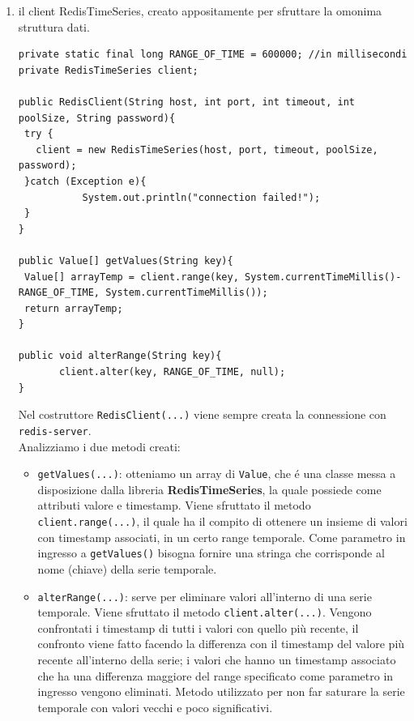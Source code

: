 \begin{enumerate}
    \item il client RedisTimeSeries, creato appositamente per sfruttare la omonima struttura dati.
    \begin{lstlisting}[autogobble, title={\texttt{RedisClient.java}}]
private static final long RANGE_OF_TIME = 600000; //in millisecondi
private RedisTimeSeries client;

public RedisClient(String host, int port, int timeout, int poolSize, String password){
 try {
   client = new RedisTimeSeries(host, port, timeout, poolSize, password);
 }catch (Exception e){
           System.out.println("connection failed!");
 }
}

public Value[] getValues(String key){
 Value[] arrayTemp = client.range(key, System.currentTimeMillis()-RANGE_OF_TIME, System.currentTimeMillis());
 return arrayTemp;
}

public void alterRange(String key){
       client.alter(key, RANGE_OF_TIME, null);
}
\end{lstlisting}
    Nel costruttore \texttt{RedisClient(...)} viene sempre creata la connessione con \texttt{redis-server}.\\
    Analizziamo i due metodi creati:
    \begin{itemize}
        \item \texttt{getValues(...)}:  otteniamo un array di \texttt{Value}, che é una classe messa a disposizione
        dalla libreria \textbf{RedisTimeSeries}, la quale possiede come attributi valore e timestamp.
        Viene sfruttato il metodo \texttt{client.range(...)}, il quale ha il compito di ottenere un insieme di valori con timestamp associati, in un certo
        range temporale. Come parametro in ingresso a \texttt{getValues()} bisogna fornire una stringa che corrisponde  al nome (chiave) della serie temporale.
        \item \texttt{alterRange(...)}: serve per eliminare valori all'interno di una serie temporale. Viene sfruttato il metodo \texttt{client.alter(...)}.
        Vengono confrontati i timestamp di tutti i valori con quello più recente, il confronto viene fatto facendo la differenza con il timestamp del valore più recente
        all'interno della serie; i valori che hanno un timestamp associato che ha una differenza maggiore del range specificato come parametro in ingresso vengono eliminati.
        Metodo utilizzato per non far saturare la serie temporale con valori vecchi e poco significativi.
    \end{itemize}
\end{enumerate}



